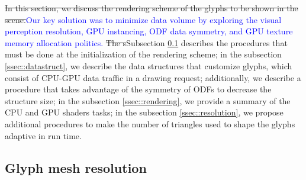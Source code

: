 \documentclass[twoside,twocolumn,10pt]{article}
\begin{document}










\sout{In this section, we discuss the rendering scheme of the glyphs to be shown in the scene.}\textcolor{blue}{Our key solution was to minimize data volume by exploring the visual perception resolution, GPU instancing, ODF data symmetry, and GPU texture memory allocation politics.} \sout{The s}Subsection \ref{ssec::precomputation} describes the procedures that must be done at the initialization of the rendering scheme; in the subsection \ref{ssec::datastruct}, we describe the data structures that customize glyphs, which consist of CPU-GPU data traffic in a drawing request; additionally, we describe a procedure that takes advantage of the symmetry of ODFs to decrease the structure size; in the subsection \ref{ssec::rendering}, we provide a summary of the CPU and GPU shaders tasks; in the subsection \ref{ssec::resolution}, we propose additional procedures to make the number of triangles used to shape the glyphs adaptive in run time.



\subsection{Glyph mesh resolution}
\label{ssec::precomputation}
\end{document}
